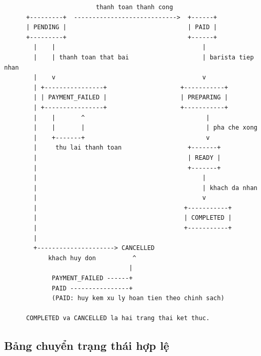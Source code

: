 \begin{verbatim}
                         thanh toan thanh cong
      +---------+  ---------------------------->  +------+
      | PENDING |                                 | PAID |
      +---------+                                 +------+
        |    |                                        |
        |    | thanh toan that bai                    | barista tiep nhan
        |    v                                        v
        | +----------------+                    +-----------+
        | | PAYMENT_FAILED |                    | PREPARING |
        | +----------------+                    +-----------+
        |    |       ^                                 |
        |    |       |                                 | pha che xong
        |    +-------+                                 v
        |     thu lai thanh toan                  +-------+
        |                                         | READY |
        |                                         +-------+
        |                                             |
        |                                             | khach da nhan
        |                                             v
        |                                        +-----------+
        |                                        | COMPLETED |
        |                                        +-----------+
        |
        +---------------------> CANCELLED
            khach huy don          ^
                                  |
             PAYMENT_FAILED ------+
             PAID ----------------+
             (PAID: huy kem xu ly hoan tien theo chinh sach)

      COMPLETED va CANCELLED la hai trang thai ket thuc.
\end{verbatim}

\subsection{Bảng chuyển trạng thái hợp lệ}

